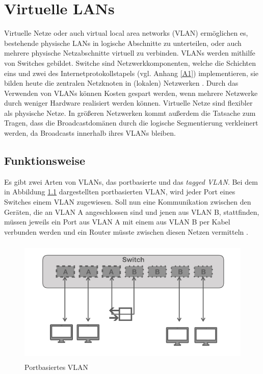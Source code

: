 \chapter{Virtuelle LANs}

Virtuelle Netze oder auch virtual local area networks (VLAN) ermöglichen es, bestehende physische LANs in logische Abschnitte zu unterteilen, oder auch mehrere physische Netzabschnitte virtuell zu verbinden. VLANs werden mithilfe von Switches gebildet. Switche sind Netzwerkkomponenten, welche die Schichten eins und zwei des Internetprotokollstapels (vgl. Anhang \ref{A1}) implementieren, sie bilden heute die zentralen Netzknoten in (lokalen) Netzwerken \cite{zisler2018computer}. 
Durch das Verwenden von VLANs können Kosten gespart werden, wenn mehrere Netzwerke durch weniger  Hardware realisiert werden können. Virtuelle Netze sind flexibler als physische Netze. In größeren Netzwerken kommt außerdem die Tatsache zum Tragen, dass die Broadcastdomänen durch die logische Segmentierung verkleinert werden, da Broadcasts  innerhalb ihres VLANs bleiben.


\section{Funktionsweise}


Es gibt zwei Arten von VLANs, das portbasierte und das \emph{tagged VLAN}. 
Bei dem in Abbildung \ref{vlanport} dargestellten portbasierten VLAN, wird jeder Port eines Switches einem VLAN zugewiesen. Soll nun eine Kommunikation zwischen den Geräten, die an VLAN A angeschlossen sind und jenen aus VLAN B, stattfinden, müssen jeweils ein Port aus VLAN A mit einem aus VLAN B per Kabel verbunden werden und ein Router müsste zwischen diesen Netzen vermitteln \cite{cisco14rout}.  


\begin{figure}[h]
\centering
	\includegraphics[width=0.8\linewidth, height= 6cm]{vlan.001.jpeg}
	\caption{Portbasiertes VLAN}
	\label{vlanport}
\end{figure}


